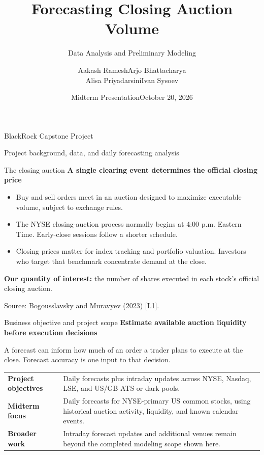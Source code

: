 \documentclass[aspectratio=169,11pt]{beamer}
\title{Forecasting Closing Auction Volume}
\subtitle{Data Analysis and Preliminary Modeling}
\author{Aakash Ramesh\quad Arjo Bhattacharya\\Alisa Priyadarsini\quad Ivan Sysoev}
\date{Midterm Presentation\quad October 20, 2026}
\newcommand{\source}[1]{\par\vfill{\fontsize{7.5}{9}\selectfont\color{Muted}#1\par}}
\newcommand{\lead}[1]{{\large\color{Teal}\bfseries #1}\par\medskip}
\newenvironment{points}{\begin{itemize}\setlength{\itemsep}{0.65em}}{\end{itemize}}
\begin{document}
\begin{frame}[plain]
\vspace{0.8cm}
{\color{Navy}\inserttitle\par}
\vspace{0.35cm}
{\color{Teal}\insertsubtitle\par}
\vspace{0.8cm}
BlackRock Capstone Project\par\smallskip
{\small\insertauthor\par}\medskip
{\color{Muted}\insertdate\par}
\vfill
{\small Project background, data, and daily forecasting analysis}
\end{frame}

\begin{frame}{The closing auction}
\lead{A single clearing event determines the official closing price}
\begin{points}
\item Buy and sell orders meet in an auction designed to maximize executable volume, subject to exchange rules.
\item The NYSE closing-auction process normally begins at 4:00 p.m. Eastern Time. Early-close sessions follow a shorter schedule.
\item Closing prices matter for index tracking and portfolio valuation. Investors who target that benchmark concentrate demand at the close.
\end{points}
\par\medskip
\textbf{Our quantity of interest:} the number of shares executed in each stock's official closing auction.
\source{Source: Bogousslavsky and Muravyev (2023) [L1].}
\end{frame}

\begin{frame}{Business objective and project scope}
\lead{Estimate available auction liquidity before execution decisions}
A forecast can inform how much of an order a trader plans to execute at the close. Forecast accuracy is one input to that decision.
\bigskip
\begin{tabularx}{\textwidth}{@{}L{3.0cm}Y@{}}
\toprule
\textbf{Project objectives} & Daily forecasts plus intraday updates across NYSE, Nasdaq, LSE, and US/GB ATS or dark pools.\\[0.6em]
\textbf{Midterm focus} & Daily forecasts for NYSE-primary US common stocks, using historical auction activity, liquidity, and known calendar events.\\[0.6em]
\textbf{Broader work} & Intraday forecast updates and additional venues remain beyond the completed modeling scope shown here.\\
\bottomrule
\end{tabularx}

\end{frame}
\end{document}
